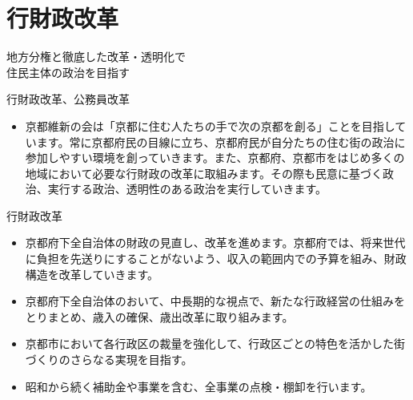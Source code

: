 \documentclass[dvipdfmx]{beamer}
\begin{document}
\section{行財政改革}
    \begin{frame}{}{}
        \sectionpage
        \begin{center}
            \begin{large}
                \alert{地方分権と徹底した改革・透明化で}\\\alert{住民主体の政治を目指す}
            \end{large}
        \end{center}
    \end{frame}

    \begin{frame}{行財政改革、公務員改革}{}
        \begin{small}
            \begin{itemize}
                \setlength{\itemsep}{2mm}
                \item 京都維新の会は「京都に住む人たちの手で次の京都を創る」ことを目指しています。常に京都府民の目線に立ち、京都府民が自分たちの住む街の政治に参加しやすい環境を創っていきます。また、京都府、京都市をはじめ多くの地域において必要な行財政の改革に取組みます。その際も民意に基づく政治、実行する政治、透明性のある政治を実行していきます。
            \end{itemize}
        \end{small}
    \end{frame}

    \begin{frame}{行財政改革}{}
        \begin{small}
            \begin{itemize}
                \setlength{\itemsep}{2mm}
                \item 京都府下全自治体の財政の見直し、改革を進めます。京都府では、将来世代に負担を先送りにすることがないよう、収入の範囲内での予算を組み、財政構造を改革していきます。
                \item 京都府下全自治体のおいて、中長期的な視点で、新たな行政経営の仕組みをとりまとめ、歳入の確保、歳出改革に取り組みます。
                \item 京都市において各行政区の裁量を強化して、行政区ごとの特色を活かした街づくりのさらなる実現を目指す。
                \item 昭和から続く補助金や事業を含む、全事業の点検・棚卸を行います。
            \end{itemize}
        \end{small}
    \end{frame}
\end{document}
